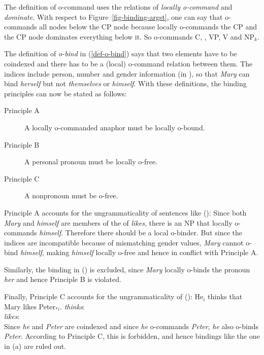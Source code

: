 \documentclass[output=paper,biblatex,babelshorthands,newtxmath,draftmode,colorlinks,citecolor=brown]{langscibook}
\begin{document}
The definition of o-command uses the relations of \emph{locally o-command} and \emph{dominate}. With respect to
Figure~\ref{fig-binding-argst}, one can say that \NPi o-commands all nodes below the CP node because
\NPi locally o-commands the CP and the CP node dominates everything below it. So \NPi o-commands
C, \NPj, VP, V and NP$_k$.

The definition of \emph{o-bind} in (\ref{def-o-bind}) says that two elements have to be coindexed
and there has to be a (local) o-command relation between them. The indices include person, number
and gender information (in ), so that \emph{Mary} can bind \emph{herself} but not
\emph{themselves} or \emph{himself}. With these definitions, the binding principles can now be stated
as follows:

\begin{principle-break}
\begin{description}
\item [Principle A] A locally o-commanded anaphor must be locally o-bound.
\item [Principle B] A personal pronoun must be locally o-free.
\item [Principle C] A nonpronoun must be o-free.
\end{description}
\end{principle-break}

\noindent
Principle A accounts for the ungrammaticality of sentences like ():
\eal
{}
\zl
Since both \emph{Mary} and \emph{himself} are members of the \argstl of \emph{likes}, there is an NP
that locally o-commands \emph{himself}. Therefore there should be a local o-binder. But since the
indices are incompatible because of mismatching gender values, \emph{Mary} cannot o-bind
\emph{himself}, making \emph{himself} locally o-free and hence in conflict with Principle A.

Similarly, the binding in () is excluded, since \emph{Mary} locally o-binds the pronoun \emph{her}
and hence Principle B is violated.
\eal
{}
\zl

\noindent
Finally, Principle C accounts for the ungrammaticality of ():
\eal
\ex He$_i$ thinks that Mary likes Peter$_{*i}$.
\ex \emph{thinks}:\\
\argst {}
\ex \emph{likes}:\\
\argst {}
\zl
Since \emph{he} and \emph{Peter} are coindexed and since \emph{he} o-commands \emph{Peter},
\emph{he} also o-binds \emph{Peter}. According to Principle C, this is forbidden, and hence bindings
like the one in (a) are ruled out.
\end{document}

